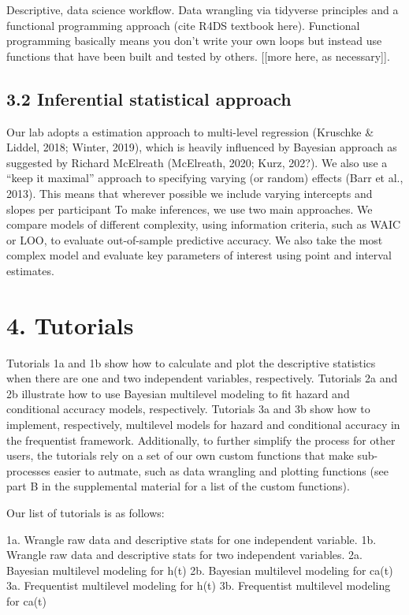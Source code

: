 \documentclass[
  man,floatsintext]{apa6}
\begin{document}
Descriptive, data science workflow.
Data wrangling via tidyverse principles and a functional programming approach (cite R4DS textbook here).
Functional programming basically means you don't write your own loops but instead use functions that have been built and tested by others.
{[}{[}more here, as necessary{]}{]}.

\subsection{3.2 Inferential statistical approach}\label{inferential-statistical-approach}

Our lab adopts a estimation approach to multi-level regression (Kruschke \& Liddel, 2018; Winter, 2019), which is heavily influenced by Bayesian approach as suggested by Richard McElreath (McElreath, 2020; Kurz, 202?). We also use a ``keep it maximal'' approach to specifying varying (or random) effects (Barr et al., 2013). This means that wherever possible we include varying intercepts and slopes per participant
To make inferences, we use two main approaches. We compare models of different complexity, using information criteria, such as WAIC or LOO, to evaluate out-of-sample predictive accuracy. We also take the most complex model and evaluate key parameters of interest using point and interval estimates.

\section{4. Tutorials}\label{tutorials}

Tutorials 1a and 1b show how to calculate and plot the descriptive statistics when there are one and two independent variables, respectively. Tutorials 2a and 2b illustrate how to use Bayesian multilevel modeling to fit hazard and conditional accuracy models, respectively. Tutorials 3a and 3b show how to implement, respectively, multilevel models for hazard and conditional accuracy in the frequentist framework.
Additionally, to further simplify the process for other users, the tutorials rely on a set of our own custom functions that make sub-processes easier to autmate, such as data wrangling and plotting functions (see part B in the supplemental material for a list of the custom functions).

Our list of tutorials is as follows:

1a. Wrangle raw data and descriptive stats for one independent variable.
1b. Wrangle raw data and descriptive stats for two independent variables.
2a. Bayesian multilevel modeling for h(t)
2b. Bayesian multilevel modeling for ca(t)
3a. Frequentist multilevel modeling for h(t)
3b. Frequentist multilevel modeling for ca(t)
\end{document}
